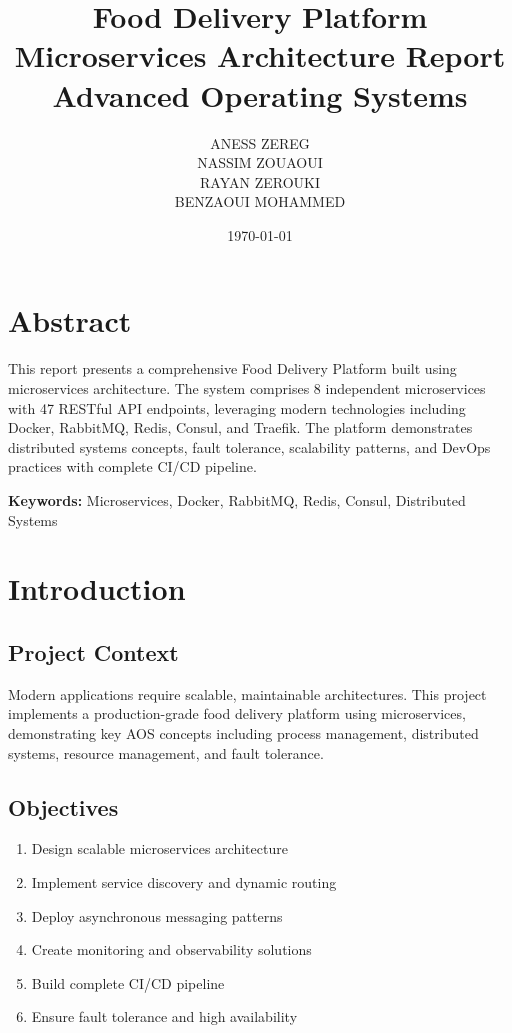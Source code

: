 \documentclass[12pt,a4paper]{article}
\title{\textbf{\Huge Food Delivery Platform} \\ 
\vspace{0.5cm}
\Large Microservices Architecture Report \\
\vspace{0.3cm}
\large Advanced Operating Systems}
\author{
    ANESS ZEREG \\ NASSIM ZOUAOUI \\ RAYAN ZEROUKI \\ BENZAOUI MOHAMMED
}
\date{\today}
\begin{document}
\maketitle
\thispagestyle{empty}
\newpage

\tableofcontents
\newpage

\section*{Abstract}

This report presents a comprehensive Food Delivery Platform built using microservices architecture. The system comprises 8 independent microservices with 47 RESTful API endpoints, leveraging modern technologies including Docker, RabbitMQ, Redis, Consul, and Traefik. The platform demonstrates distributed systems concepts, fault tolerance, scalability patterns, and DevOps practices with complete CI/CD pipeline.

\textbf{Keywords:} Microservices, Docker, RabbitMQ, Redis, Consul, Distributed Systems

\newpage

\section{Introduction}

\subsection{Project Context}
Modern applications require scalable, maintainable architectures. This project implements a production-grade food delivery platform using microservices, demonstrating key AOS concepts including process management, distributed systems, resource management, and fault tolerance.

\subsection{Objectives}
\begin{enumerate}
    \item Design scalable microservices architecture
    \item Implement service discovery and dynamic routing
    \item Deploy asynchronous messaging patterns
    \item Create monitoring and observability solutions
    \item Build complete CI/CD pipeline
    \item Ensure fault tolerance and high availability
\end{enumerate}
\end{document}
